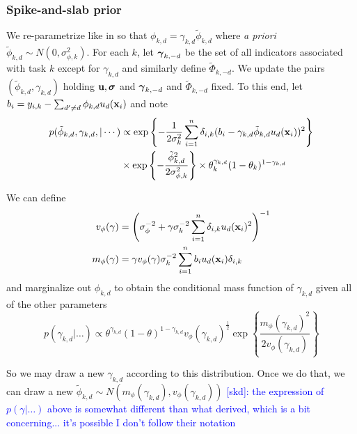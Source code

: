 \documentclass[12pt]{article}
\begin{document}
\subsubsection{Spike-and-slab prior}

We re-parametrize like in \citet{Titsias2011} so that $\phi_{k,d} = \gamma_{k,d}\tilde{\phi}_{k,d}$ where \textit{a priori} $\tilde{\phi}_{k,d} \sim N(0,\sigma^{2}_{\phi,k}).$
For each $k$, let $\boldsymbol{\gamma}_{k,-d}$ be the set of all indicators associated with task $k$ except for $\gamma_{k,d}$ and similarly define $\tilde{\Phi}_{k,-d}.$
We update the pairs $(\tilde{\phi}_{k,d}, \gamma_{k,d})$ holding $\mathbf{u}, \boldsymbol{\sigma}$ and $\boldsymbol{\gamma}_{k,-d}$ and $\tilde{\Phi}_{k,-d}$ fixed.
To this end, let $b_{i} = y_{i,k} - \sum_{d' \neq d}{\phi_{k,d}u_{d}(\mathbf{x}_{i})}$ and note
\begin{align*}
p(\tilde{\phi}_{k,d}, \gamma_{k,d},| \cdots) &\propto \exp\left\{-\frac{1}{2\sigma^{2}_{k}}\sum_{i = 1}^{n}{\delta_{i,k}(b_{i} - \gamma_{k,d}\tilde{\phi}_{k,d}u_{d}(\mathbf{x}_{i}))^{2}} \right\} \\
&\times \exp\left\{-\frac{\tilde{\phi}^{2}_{k,d}}{2\sigma^{2}_{\phi,k}} \right\} \times \theta_{k}^{\gamma_{k,d}}(1 - \theta_{k})^{1 - \gamma_{k,d}}
\end{align*}

We can define
\begin{align*}
v_{\phi}(\gamma) &= \left(\sigma_{\phi}^{-2} + \gamma\sigma^{-2}_{k}\sum_{i = 1}^{n}{\delta_{i,k}u_{d}(\mathbf{x}_{i})^{2}}\right)^{-1} \\
m_{\phi}(\gamma) &= \gamma v_{\phi}(\gamma)\sigma^{-2}_{k}\sum_{i = 1}^{n}{b_{i}u_{d}(\mathbf{x}_{i})\delta_{i,k}}
\end{align*}
and marginalize out $\phi_{k,d}$ to obtain the conditional mass function of $\gamma_{k,d}$ given all of the other parameters
$$
p(\gamma_{k,d} | \ldots) \propto \theta^{\gamma_{k,d}}(1 - \theta)^{1 - \gamma_{k,d}}v_{\phi}(\gamma_{k,d})^{\frac{1}{2}}\exp\left\{\frac{m_{\phi}(\gamma_{k,d})^{2}}{2v_{\phi}(\gamma_{k,d})}\right\}
$$

So we may draw a new $\gamma_{k,d}$ according to this distribution.
Once we do that, we can draw a new $\tilde{\phi}_{k,d} \sim N(m_{\phi}(\gamma_{k,d}), v_{\phi}(\gamma_{k,d}))$
\textcolor{blue}{[skd]: the expression of $p(\gamma | \ldots)$ above is somewhat different than what \citet{Titsias2011} derived, which is a bit concerning... it's possible I don't follow their notation}
\end{document}
